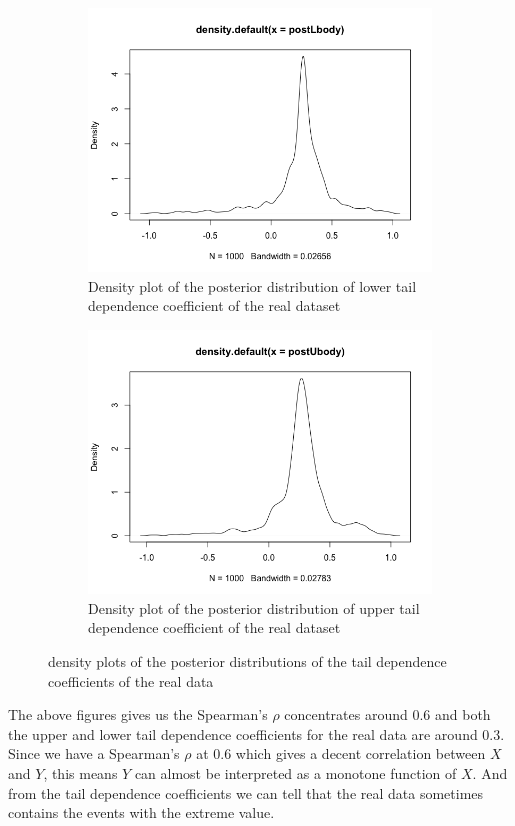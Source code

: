 \documentclass[mstat,12pt]{unswthesis}  %
\numberwithin{equation}{section}
\begin{document}
\begin{figure}[H]
\centering
\begin{subfigure}{.42\textwidth}
  \centering
  \includegraphics[width=\linewidth]{postLbody.png}  
  \caption{Density plot of the posterior distribution of lower tail dependence coefficient of the real dataset}
  \label{fig:sub-first}
\end{subfigure}
\begin{subfigure}{.42\textwidth}
  \centering
  \includegraphics[width=\linewidth]{postUbody.png}  
  \caption{Density plot of the posterior distribution of upper tail dependence coefficient of the real dataset}
  \label{fig:sub-second}
\end{subfigure}
\caption{density plots of the posterior distributions of the tail dependence coefficients of the real data}
\end{figure}
The above figures gives us the Spearman's $\rho$ concentrates around 0.6 and both the upper and lower tail dependence coefficients for the real data are around 0.3. Since we have a Spearman's $\rho$ at 0.6 which gives a decent correlation between $X$ and $Y$, this means $Y$ can almost be interpreted as a monotone function of $X$. And from the tail dependence coefficients we can tell that the real data sometimes contains the events with the extreme value.
\end{document}
